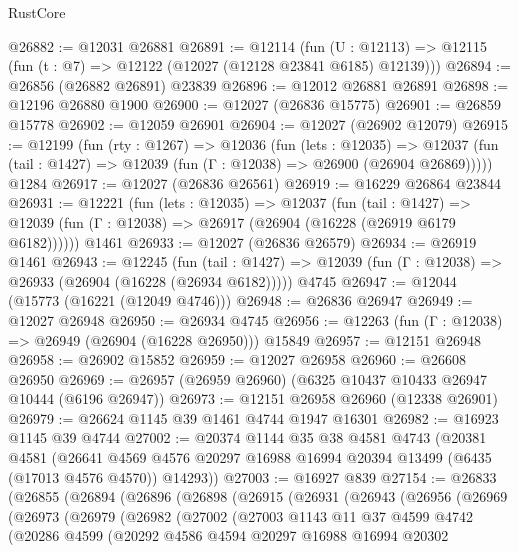 \begin{lexlean}{RustCore}
\begin{coremodule}
@26882 := @12031 @26881
@26891 := @12114
    (fun (U : @12113) => @12115 (fun (t : @7) => @12122 (@12027 (@12128 @23841 @6185) @12139)))
@26894 := @26856 (@26882 @26891) @23839
@26896 := @12012 @26881 @26891
@26898 := @12196 @26880 @1900
@26900 := @12027 (@26836 @15775)
@26901 := @26859 @15778
@26902 := @12059 @26901
@26904 := @12027 (@26902 @12079)
@26915 := @12199
    (fun (rty : @1267) =>
    @12036
      (fun (lets : @12035) =>
      @12037 (fun (tail : @1427) => @12039 (fun (Γ : @12038) => @26900 (@26904 @26869)))))
    @1284
@26917 := @12027 (@26836 @26561)
@26919 := @16229 @26864 @23844
@26931 := @12221
    (fun (lets : @12035) =>
    @12037
      (fun (tail : @1427) =>
      @12039 (fun (Γ : @12038) => @26917 (@26904 (@16228 (@26919 @6179 @6182))))))
    @1461
@26933 := @12027 (@26836 @26579)
@26934 := @26919 @1461
@26943 := @12245
    (fun (tail : @1427) => @12039 (fun (Γ : @12038) => @26933 (@26904 (@16228 (@26934 @6182)))))
    @4745
@26947 := @12044 (@15773 (@16221 (@12049 @4746)))
@26948 := @26836 @26947
@26949 := @12027 @26948
@26950 := @26934 @4745
@26956 := @12263 (fun (Γ : @12038) => @26949 (@26904 (@16228 @26950))) @15849
@26957 := @12151 @26948
@26958 := @26902 @15852
@26959 := @12027 @26958
@26960 := @26608 @26950
@26969 := @26957 (@26959 @26960) (@6325 @10437 @10433 @26947 @10444 (@6196 @26947))
@26973 := @12151 @26958 @26960 (@12338 @26901)
@26979 := @26624 @1145 @39 @1461 @4744 @1947 @16301
@26982 := @16923 @1145 @39 @4744
@27002 := @20374
    @1144
    @35
    @38
    @4581
    @4743
    (@20381
      @4581
      (@26641 @4569 @4576 @20297 @16988 @16994 @20394 @13499 (@6435 (@17013 @4576 @4570)) @14293))
@27003 := @16927 @839
@27154 := @26833
    (@26855
      (@26894
        (@26896
          (@26898
            (@26915
              (@26931
                (@26943
                  (@26956
                    (@26969
                      (@26973
                        (@26979
                          (@26982
                            (@27002
                              (@27003
                                @1143
                                @11
                                @37
                                @4599
                                @4742
                                (@20286
                                  @4599
                                  (@20292
                                    @4586
                                    @4594
                                    @20297
                                    @16988
                                    @16994
                                    @20302

\end{coremodule}
\end{lexlean}
